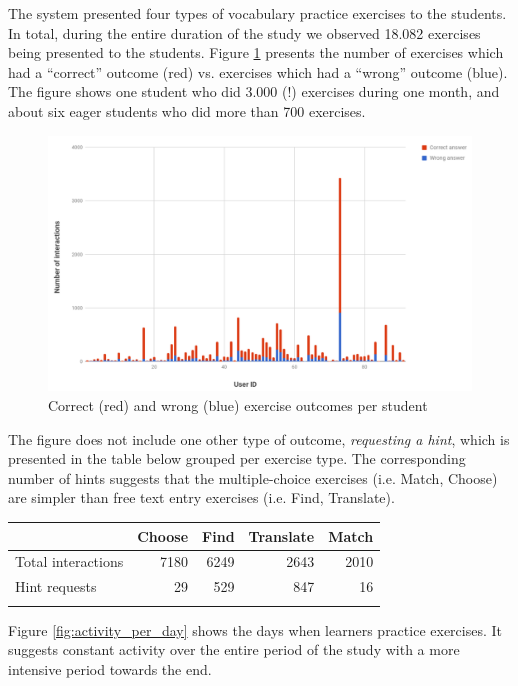 The system presented four types of vocabulary practice exercises to the students. In total, during the entire duration of the study we observed 18.082 exercises being presented to the students. Figure \ref{fig:ex_interactions} presents the number of exercises which had a ``correct'' outcome (red) vs. exercises which had a ``wrong'' outcome (blue). The figure shows one student who did 3.000 (!) exercises during one month, and about six eager students who did more than 700 exercises. 

  \begin{figure}[h!]
  \centering
    \includegraphics[width=\columnwidth]{figures/exercise_interactions_count.png}
    \caption{Correct (red) and wrong (blue) exercise outcomes per student}
    \label{fig:ex_interactions}
  \end{figure}

The figure does not include one other type of outcome, {\em requesting a hint}, which is presented in the table below grouped per exercise type. The corresponding number of hints suggests that the multiple-choice exercises (i.e. Match, Choose) are simpler than free text entry exercises (i.e. Find, Translate).

\begin{tabular}{lrrrr}
                      & Choose  & Find & Translate & Match \\ \hline
  Total interactions  & 7180    & 6249 & 2643      & 2010\\
  Hint requests       & 29      & 529  & 847       & 16 \\ \hline
  \label{tab:hints_per_ex_type}
\end{tabular}

Figure \ref{fig:activity_per_day} shows the days when learners practice exercises. It suggests constant activity over the entire period of the study with a more intensive period towards the end.

